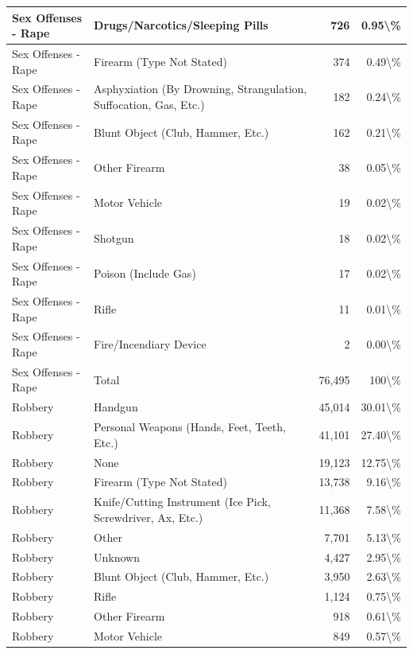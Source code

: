 \documentclass[
]{krantz}
\begin{document}
\begin{longtable}[t]{l|l|r|r}
\hline
Sex Offenses - Rape & Drugs/Narcotics/Sleeping Pills & 726 & 0.95\textbackslash{}\%\\
\hline
Sex Offenses - Rape & Firearm (Type Not Stated) & 374 & 0.49\textbackslash{}\%\\
\hline
Sex Offenses - Rape & Asphyxiation (By Drowning, Strangulation, Suffocation, Gas, Etc.) & 182 & 0.24\textbackslash{}\%\\
\hline
Sex Offenses - Rape & Blunt Object (Club, Hammer, Etc.) & 162 & 0.21\textbackslash{}\%\\
\hline
Sex Offenses - Rape & Other Firearm & 38 & 0.05\textbackslash{}\%\\
\hline
Sex Offenses - Rape & Motor Vehicle & 19 & 0.02\textbackslash{}\%\\
\hline
Sex Offenses - Rape & Shotgun & 18 & 0.02\textbackslash{}\%\\
\hline
Sex Offenses - Rape & Poison (Include Gas) & 17 & 0.02\textbackslash{}\%\\
\hline
Sex Offenses - Rape & Rifle & 11 & 0.01\textbackslash{}\%\\
\hline
Sex Offenses - Rape & Fire/Incendiary Device & 2 & 0.00\textbackslash{}\%\\
\hline
Sex Offenses - Rape & Total & 76,495 & 100\textbackslash{}\%\\
\hline
Robbery & Handgun & 45,014 & 30.01\textbackslash{}\%\\
\hline
Robbery & Personal Weapons (Hands, Feet, Teeth, Etc.) & 41,101 & 27.40\textbackslash{}\%\\
\hline
Robbery & None & 19,123 & 12.75\textbackslash{}\%\\
\hline
Robbery & Firearm (Type Not Stated) & 13,738 & 9.16\textbackslash{}\%\\
\hline
Robbery & Knife/Cutting Instrument (Ice Pick, Screwdriver, Ax, Etc.) & 11,368 & 7.58\textbackslash{}\%\\
\hline
Robbery & Other & 7,701 & 5.13\textbackslash{}\%\\
\hline
Robbery & Unknown & 4,427 & 2.95\textbackslash{}\%\\
\hline
Robbery & Blunt Object (Club, Hammer, Etc.) & 3,950 & 2.63\textbackslash{}\%\\
\hline
Robbery & Rifle & 1,124 & 0.75\textbackslash{}\%\\
\hline
Robbery & Other Firearm & 918 & 0.61\textbackslash{}\%\\
\hline
Robbery & Motor Vehicle & 849 & 0.57\textbackslash{}\%\\

\end{longtable}
\end{document}
